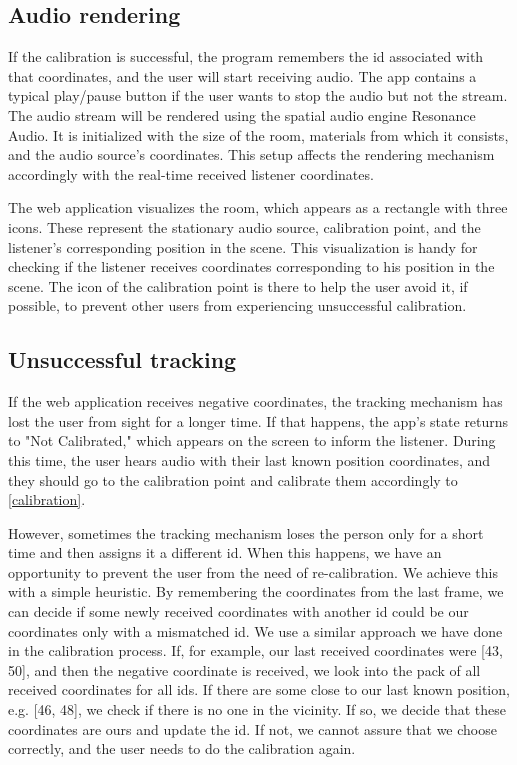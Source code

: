 \documentclass{ctuthesis}
\begin{document}
\subsection{Audio rendering}
If the calibration is successful, the program remembers the id associated with that coordinates, and the user will start receiving audio. The app contains a typical play/pause button if the user wants to stop the audio but not the stream. The audio stream will be rendered using the spatial audio engine Resonance Audio. It is initialized with the size of the room, materials from which it consists, and the audio source's coordinates. This setup affects the rendering mechanism accordingly with the real-time received listener coordinates. 

The web application visualizes the room, which appears as a rectangle with three icons. These represent the stationary audio source, calibration point, and the listener's corresponding position in the scene. This visualization is handy for checking if the listener receives coordinates corresponding to his position in the scene. The icon of the calibration point is there to help the user avoid it, if possible, to prevent other users from experiencing unsuccessful calibration.

\subsection{Unsuccessful tracking}
If the web application receives negative coordinates, the tracking mechanism has lost the user from sight for a longer time. If that happens, the app's state returns to "Not Calibrated," which appears on the screen to inform the listener. During this time, the user hears audio with their last known position coordinates, and they should go to the calibration point and calibrate them accordingly to \ref{calibration}.

However, sometimes the tracking mechanism loses the person only for a short time and then assigns it a different id. When this happens, we have an opportunity to prevent the user from the need of re-calibration. We achieve this with a simple heuristic. By remembering the coordinates from the last frame, we can decide if some newly received coordinates with another id could be our coordinates only with a mismatched id. We use a similar approach we have done in the calibration process. If, for example, our last received coordinates were [43, 50], and then the negative coordinate is received, we look into the pack of all received coordinates for all ids. If there are some close to our last known position, e.g. [46, 48], we check if there is no one in the vicinity. If so, we decide that these coordinates are ours and update the id. If not, we cannot assure that we choose correctly, and the user needs to do the calibration again.
\end{document}

